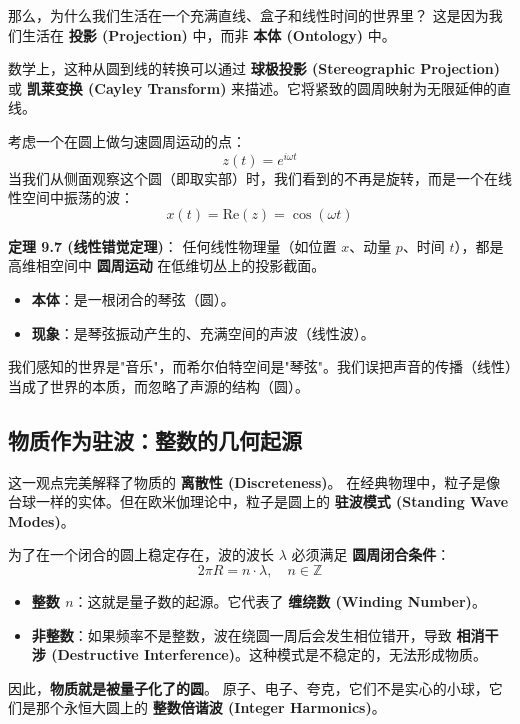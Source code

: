 那么，为什么我们生活在一个充满直线、盒子和线性时间的世界里？
这是因为我们生活在 \textbf{投影 (Projection)} 中，而非 \textbf{本体 (Ontology)} 中。

数学上，这种从圆到线的转换可以通过 \textbf{球极投影 (Stereographic Projection)} 或 \textbf{凯莱变换 (Cayley Transform)} 来描述。它将紧致的圆周映射为无限延伸的直线。

考虑一个在圆上做匀速圆周运动的点：
\[z(t) = e^{i\omega t}\]
当我们从侧面观察这个圆（即取实部）时，我们看到的不再是旋转，而是一个在线性空间中振荡的波：
\[x(t) = \text{Re}(z) = \cos(\omega t)\]

\textbf{定理 9.7 (线性错觉定理)}：
任何线性物理量（如位置 $x$、动量 $p$、时间 $t$），都是高维相空间中 \textbf{圆周运动} 在低维切丛上的投影截面。

\begin{itemize}
\item \textbf{本体}：是一根闭合的琴弦（圆）。
\item \textbf{现象}：是琴弦振动产生的、充满空间的声波（线性波）。
\end{itemize}

我们感知的世界是"音乐"，而希尔伯特空间是"琴弦"。我们误把声音的传播（线性）当成了世界的本质，而忽略了声源的结构（圆）。

\subsection{物质作为驻波：整数的几何起源}

这一观点完美解释了物质的 \textbf{离散性 (Discreteness)}。
在经典物理中，粒子是像台球一样的实体。但在欧米伽理论中，粒子是圆上的 \textbf{驻波模式 (Standing Wave Modes)}。

为了在一个闭合的圆上稳定存在，波的波长 $\lambda$ 必须满足 \textbf{圆周闭合条件}：
\[2\pi R = n \cdot \lambda, \quad n \in \mathbb{Z}\]

\begin{itemize}
\item \textbf{整数 $n$}：这就是量子数的起源。它代表了 \textbf{缠绕数 (Winding Number)}。
\item \textbf{非整数}：如果频率不是整数，波在绕圆一周后会发生相位错开，导致 \textbf{相消干涉 (Destructive Interference)}。这种模式是不稳定的，无法形成物质。
\end{itemize}

因此，\textbf{物质就是被量子化了的圆}。
原子、电子、夸克，它们不是实心的小球，它们是那个永恒大圆上的 \textbf{整数倍谐波 (Integer Harmonics)}。

